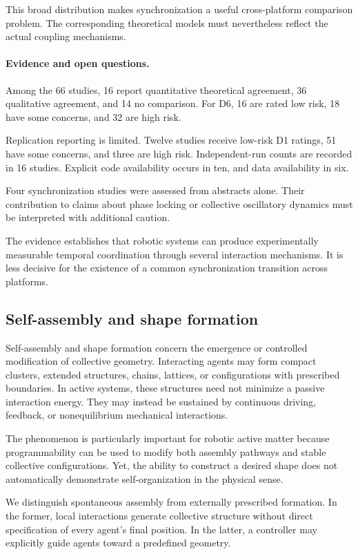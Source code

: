 This broad distribution
makes synchronization
a useful cross-platform
comparison problem.
The corresponding
theoretical models
must nevertheless
reflect the actual
coupling mechanisms.

\paragraph*{Evidence and open questions.}

Among the 66 studies,
16 report quantitative
theoretical agreement,
36 qualitative agreement,
and 14 no comparison.
For D6, 16 are rated
low risk, 18 have
some concerns, and
32 are high risk.

Replication reporting
is limited. Twelve
studies receive low-risk
D1 ratings, 51 have
some concerns, and
three are high risk.
Independent-run counts
are recorded in 16 studies.
Explicit code availability
occurs in ten,
and data availability
in six.

Four synchronization studies
were assessed from abstracts
alone. Their contribution
to claims about phase
locking or collective
oscillatory dynamics
must be interpreted
with additional caution.

The evidence establishes
that robotic systems
can produce experimentally
measurable temporal
coordination through
several interaction
mechanisms. It is
less decisive for
the existence of
a common synchronization
transition across
platforms.

\subsection{Self-assembly and shape formation}
\label{sec:phenomena-self-assembly}

Self-assembly and shape formation concern the
emergence or controlled modification of collective
geometry. Interacting agents may form compact
clusters, extended structures, chains, lattices,
or configurations with prescribed boundaries.
In active systems, these structures need not
minimize a passive interaction energy.
They may instead be sustained by continuous
driving, feedback, or nonequilibrium
mechanical interactions.

The phenomenon is particularly important
for robotic active matter because
programmability can be used to modify
both assembly pathways and stable
collective configurations. Yet,
the ability to construct a desired
shape does not automatically
demonstrate self-organization
in the physical sense.

We distinguish spontaneous assembly
from externally prescribed formation.
In the former, local interactions
generate collective structure
without direct specification
of every agent's final position.
In the latter, a controller
may explicitly guide agents
toward a predefined geometry.

